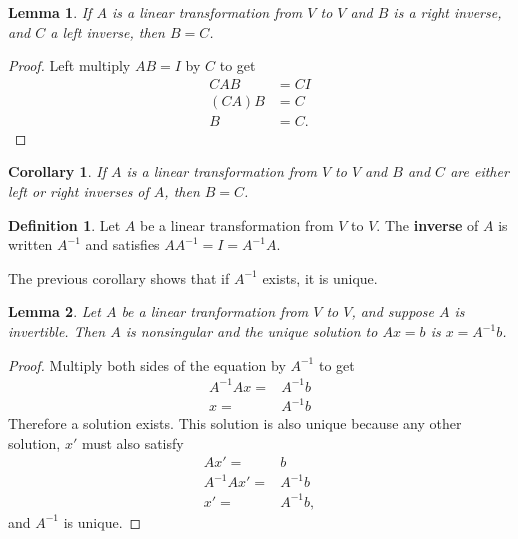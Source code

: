 \documentclass[12pt,reqno]{amsart}
\newtheorem{corollary}{Corollary}[section]
\newtheorem{lemma}{Lemma}[section]
\theoremstyle{definition}
\newtheorem{definition}{Definition}[section]
\begin{document}
\begin{lemma}
  If $A$ is a linear transformation from $V$ to $V$ and $B$ is a right
  inverse, and $C$ a left inverse, then $B = C$. 
\end{lemma}
\begin{proof}
  Left multiply $AB = I$ by $C$ to get
  \begin{align*}
    CAB & = CI \\
    (CA) B & = C \\
    B & = C.
  \end{align*}
\end{proof}
\begin{corollary}
  If $A$ is a linear transformation from $V$ to $V$ and $B$ and $C$
  are either left or right inverses of $A$, then $B=C$.
\end{corollary}

\begin{definition} 
  Let $A$ be a linear transformation from $V$ to $V$. The
  \textbf{inverse} of $A$ is written $A^{-1}$ and satisfies $A A^{-1}
  = I = A^{-1} A$.
\end{definition}
The previous corollary shows that if $A^{-1}$ exists, it is unique. 

\begin{lemma}
  Let $A$ be a linear tranformation from $V$ to $V$, and suppose $A$
  is invertible. Then $A$ is nonsingular and the unique solution to
  $Ax = b$ is $x = A^{-1} b$. 
\end{lemma}
\begin{proof}
  Multiply both sides of the equation by $A^{-1}$ to get
  \begin{align*}
    A^{-1} A x =  & A^{-1} b \\
    x = & A^{-1} b
  \end{align*}
  Therefore a solution exists. This solution is also unique because
  any other solution, $x'$ must also satisfy 
  \begin{align*}
    A x' =  &  b \\
    A^{-1} A x'= & A^{-1} b \\
    x' = & A^{-1} b,
  \end{align*}
  and $A^{-1}$ is unique. 
\end{proof}
\end{document}
